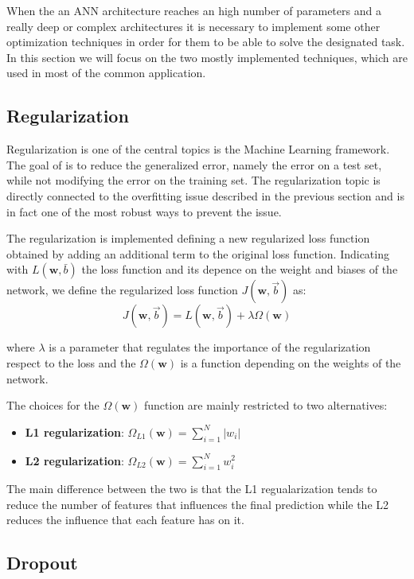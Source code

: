 When the an ANN architecture reaches an high number of parameters and a really deep or complex architectures it is necessary to implement some other optimization techniques in order for them to be able to solve the designated task. In this section we will focus on the two mostly implemented techniques, which are used in most of the common application.

\subsection{Regularization}

Regularization is one of the central topics is the Machine Learning framework. The goal of is to reduce the generalized error, namely the error on a test set, while not modifying the error on the training set. The regularization topic is directly connected to the overfitting issue described in the previous section and is in fact one of the most robust ways to prevent the issue. 

The regularization is implemented defining a new regularized loss function obtained by adding an additional term to the original loss function. Indicating with $L(\boldsymbol{w},\bar{b})$ the loss function and its depence on the weight and biases of the network, we define the regularized loss function $J(\mathbf{w}, \vec{b})$ as:
\begin{equation}
J(\mathbf{w}, \vec{b})=L(\mathbf{w}, \vec{b})+ \lambda\Omega(\mathbf{w})
\end{equation}

where $\lambda$ is a parameter that regulates the importance of the regularization respect to the loss and the $\Omega(\mathbf{w})$ is a function depending on the weights of the network. 

The choices for the $\Omega(\mathbf{w})$ function are mainly restricted to two alternatives:
\begin{itemize}
    \item \textbf{L1 regularization}: $\Omega_{L1}(\mathbf{w}) = \sum_{i=1}^N |w_i|$
    \item \textbf{L2 regularization}: $\Omega_{L2}(\mathbf{w}) = \sum_{i=1}^N w_i^2$
\end{itemize}

The main difference between the two is that the L1 regualarization tends to reduce the number of features that influences the final prediction while the L2 reduces the influence that each feature has on it.


\subsection{Dropout}

